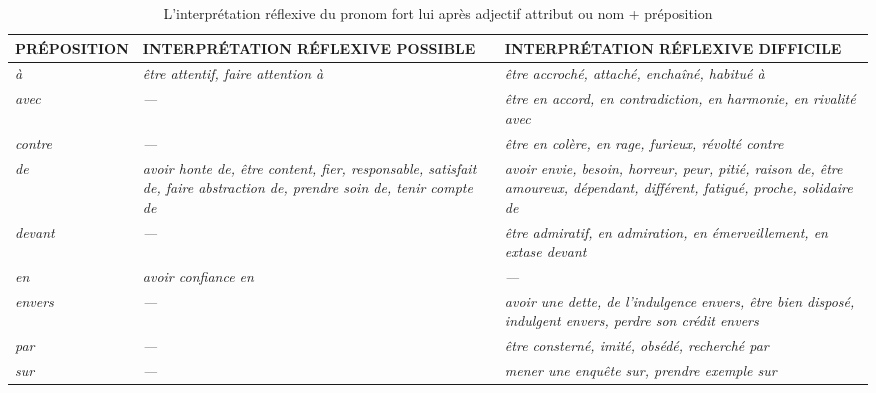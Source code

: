 \documentclass[UTF8]{report}
\begin{document}
\begin{table}[H]
\centering
\begin{tabular}{|l|>{\RaggedRight\arraybackslash}p{6cm}|>{\RaggedRight\arraybackslash}p{6cm}|}
\hline
\rowcolor{cyan!20}
\textbf{PRÉPOSITION} & \textbf{INTERPRÉTATION RÉFLEXIVE POSSIBLE} & \textbf{INTERPRÉTATION RÉFLEXIVE DIFFICILE} \\
\hline
\textit{à} & \textit{être attentif, faire attention à} & \textit{être accroché, attaché, enchaîné, habitué à} \\
\hline
\textit{avec} & \textit{---} & \textit{être en accord, en contradiction, en harmonie, en rivalité avec} \\
\hline
\textit{contre} & \textit{---} & \textit{être en colère, en rage, furieux, révolté contre} \\
\hline
\textit{de} & \textit{avoir honte de, être content, fier, responsable, satisfait de, faire abstraction de, prendre soin de, tenir compte de} & \textit{avoir envie, besoin, horreur, peur, pitié, raison de, être amoureux, dépendant, différent, fatigué, proche, solidaire de} \\
\hline
\textit{devant} & \textit{---} & \textit{être admiratif, en admiration, en émerveillement, en extase devant} \\
\hline
\textit{en} & \textit{avoir confiance en} & \textit{---} \\
\hline
\textit{envers} & \textit{---} & \textit{avoir une dette, de l'indulgence envers, être bien disposé, indulgent envers, perdre son crédit envers} \\
\hline
\textit{par} & \textit{---} & \textit{être consterné, imité, obsédé, recherché par} \\
\hline
\textit{sur} & \textit{---} & \textit{mener une enquête sur, prendre exemple sur} \\
\hline
\end{tabular}
\caption{ L’interprétation réflexive du pronom fort lui après adjectif attribut ou nom + préposition}
\end{table}
\end{document}
